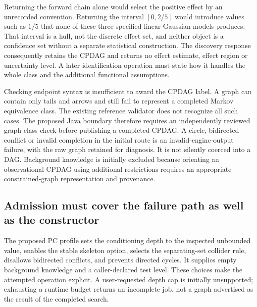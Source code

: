 Returning the forward chain alone would select the positive effect by an
unrecorded convention. Returning the interval \([0,2/5]\) would
introduce values such as \(1/5\) that none of these three specified
linear Gaussian models produces. That interval is a hull, not the
discrete effect set, and neither object is a confidence set without a
separate statistical construction. The discovery response consequently
retains the CPDAG and returns no effect estimate, effect region or
uncertainty level. A later identification operation must state how it
handles the whole class and the additional functional assumptions.
\citep{exec13_java_adapter_contract,exec13_java_adapter_oracles}

Checking endpoint syntax is insufficient to award the CPDAG label. A
graph can contain only tails and arrows and still fail to represent a
completed Markov equivalence class. The existing reference validator
does not recognize all such cases. The proposed Java boundary therefore
requires an independently reviewed graph-class check before publishing a
completed CPDAG. A circle, bidirected conflict or invalid completion in
the initial route is an invalid-engine-output failure, with the raw
graph retained for diagnosis. It is not silently coerced into a DAG.
Background knowledge is initially excluded because orienting an
observational CPDAG using additional restrictions requires an
appropriate constrained-graph representation and provenance.
\citep{exec13_java_adapter_contract}

\hypertarget{admission-must-cover-the-failure-path-as-well-as-the-constructor}{%
\subsection{Admission must cover the failure path as well as the
constructor}\label{admission-must-cover-the-failure-path-as-well-as-the-constructor}}

The proposed PC profile sets the conditioning depth to the inspected
unbounded value, enables the stable skeleton option, selects the
separating-set collider rule, disallows bidirected conflicts, and
prevents directed cycles. It supplies empty background knowledge and a
caller-declared test level. These choices make the attempted operation
explicit. A user-requested depth cap is initially unsupported;
exhausting a runtime budget returns an incomplete job, not a graph
advertised as the result of the completed search.
\citep{exec13_java_adapter_contract,exec13_java_adapter_source}

